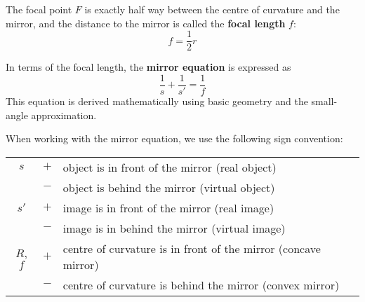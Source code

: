 %
%
%
The focal point $F$ is exactly half way between the centre of curvature and
the mirror, and the distance to the mirror is called the \textbf{focal length}
$f$:
\begin{equation}
  \boxed{f=\frac12 r}
\end{equation}

%
%
%
In terms of the focal length, the \textbf{mirror equation} is expressed as
\begin{equation}
  \boxed{\frac1s+\frac1{s'}=\frac1f}
\end{equation}
This equation is derived mathematically using basic geometry and the
small-angle approximation.

%
%
%
When working with the mirror equation, we use the following sign convention:  
\begin{center}
  \begin{tabular}{ccl}
    \hline
    $s$ & $+$ & object is in front of the mirror (real object) \\
    & $-$ & object is behind the mirror (virtual object)\\\hline
    $s'$ & $+$ & image is in front of the mirror (real image)\\
    & $-$ & image is in behind the mirror (virtual image)\\\hline
    $R$, $f$ & $+$ & centre of curvature is in front of the mirror
    (concave mirror)\\
    & $-$ & centre of curvature is behind the mirror (convex mirror)\\
    \hline
  \end{tabular}
\end{center}

